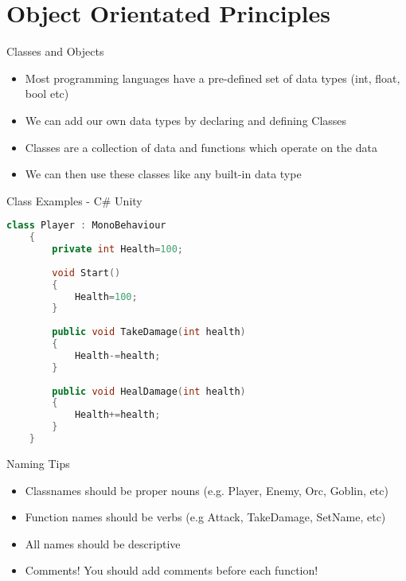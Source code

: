 \part{Object Orientated Principles}
\frame{\partpage}

\begin{frame}{Classes and Objects}
	\begin{itemize}
		\pause \item Most programming languages have a pre-defined set of data types (int, float, bool etc)
		\pause \item We can add our own data types by declaring and defining Classes
		\pause \item Classes are a collection of data and functions which operate on the data
		\pause \item We can then use these classes like any built-in data type
	\end{itemize}
\end{frame}



\begin{frame}[fragile]{Class Examples - C\# Unity}
	\begin{lstlisting}[language=C++]
	class Player : MonoBehaviour
	{
		private int Health=100;
		
		void Start()
		{
			Health=100;
		}
	
		public void TakeDamage(int health)
		{
			Health-=health;
		}
	
		public void HealDamage(int health)
		{
			Health+=health;
		}
	}
	\end{lstlisting}
\end{frame}

\begin{frame}{Naming Tips}
	\begin{itemize}
		\pause \item Classnames should be proper nouns (e.g. Player, Enemy, Orc, Goblin, etc)
		\pause \item Function names should be verbs (e.g Attack, TakeDamage, SetName, etc)
		\pause \item All names should be descriptive
		\pause \item Comments! You should add comments before each function!
	\end{itemize}
\end{frame}

